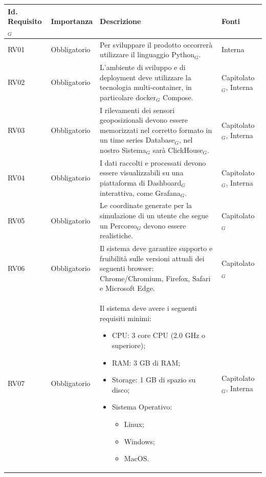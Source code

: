 \documentclass[10pt]{article}
\begin{document}
\begin{justify}
\begin{table}[H]
\centering
\renewcommand{\arraystretch}{1.5}
\begin{tabular}{|>{\centering\arraybackslash}m{2.7cm}|>{\centering\arraybackslash}m{2.7cm}|>{\centering\arraybackslash}m{6cm}|>{\centering\arraybackslash}m{2.1cm}|}
\hline
\textbf{Id. Requisito$_G$} & \textbf{Importanza} & \textbf{Descrizione} & \textbf{Fonti}\\
\hline
RV01 & Obbligatorio &  Per sviluppare il prodotto occorrerà utilizzare il linguaggio Python$_G$. & Interna\\
\hline 
RV02 & Obbligatorio & L'ambiente di sviluppo e di deployment deve utilizzare la tecnologia multi-container, in particolare docker$_G$ Compose. & Capitolato$_G$, Interna\\
\hline
RV03 & Obbligatorio & I rilevamenti dei sensori geoposizionali
devono essere memorizzati nel corretto formato in un time series Database$_G$, nel nostro Sistema$_G$ sarà ClickHouse$_G$. & Capitolato$_G$, Interna \\
\hline
RV04 & Obbligatorio & I dati raccolti e processati devono essere visualizzabili su una piattaforma di Dashboard$_G$ interattiva, come Grafana$_G$. & Capitolato$_G$, Interna\\
\hline
RV05 & Obbligatorio & Le coordinate generate per la simulazione di un utente che segue un Percorso$_G$ devono essere realistiche. & Capitolato$_G$\\
\hline
RV06 & Obbligatorio & Il sistema deve garantire supporto e fruibilità sulle versioni attuali dei seguenti browser: Chrome/Chromium, Firefox, Safari e Microsoft Edge. & Capitolato$_G$\\
\hline 
RV07 & Obbligatorio & Il sistema deve avere i seguenti requisiti minimi:
\begin{itemize}
    \item CPU: 3 core CPU (2.0 GHz o superiore);
    \item RAM: 3 GB di RAM;
    \item Storage: 1 GB di spazio su disco;
    \item Sistema Operativo:
    \begin{itemize}
        \item Linux;
        \item Windows;
        \item MacOS.
    \end{itemize}
\end{itemize} & Capitolato$_G$, Interna\\
\hline 
\end{tabular}


\end{table}
\end{justify}
\end{document}
